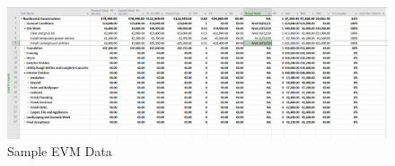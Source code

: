 \newpage

\begin{figure}
	\centering
	\includegraphics[width=1.0\linewidth]{./img/TableConfiguration.png}
	\caption{Sample EVM Data}
	\label{fig:TableData}
\end{figure}

